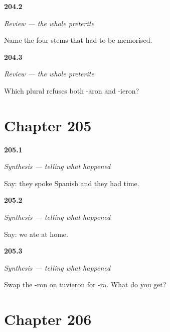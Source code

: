 \noindent\begin{minipage}[t]{\linewidth}
\raggedright
\hypertarget{review-ES-C55-repaso-preterito-strong}{\textbf{204.2}} \emph{Review — the whole preterite}\par
\small Name the four stems that had to be memorised.
\end{minipage}\par\medskip

\noindent\begin{minipage}[t]{\linewidth}
\raggedright
\hypertarget{review-ES-C55-repaso-preterito-odd}{\textbf{204.3}} \emph{Review — the whole preterite}\par
\small Which plural refuses both -aron and -ieron?
\end{minipage}\par\medskip

\section*{Chapter 205}

\noindent\begin{minipage}[t]{\linewidth}
\raggedright
\hypertarget{review-ES-C55-sintesis-preterito-completo-story}{\textbf{205.1}} \emph{Synthesis — telling what happened}\par
\small Say: they spoke Spanish and they had time.
\end{minipage}\par\medskip

\noindent\begin{minipage}[t]{\linewidth}
\raggedright
\hypertarget{review-ES-C55-sintesis-preterito-completo-we}{\textbf{205.2}} \emph{Synthesis — telling what happened}\par
\small Say: we ate at home.
\end{minipage}\par\medskip

\noindent\begin{minipage}[t]{\linewidth}
\raggedright
\hypertarget{review-ES-C55-sintesis-preterito-completo-raw}{\textbf{205.3}} \emph{Synthesis — telling what happened}\par
\small Swap the -ron on tuvieron for -ra. What do you get?
\end{minipage}\par\medskip

\section*{Chapter 206}

